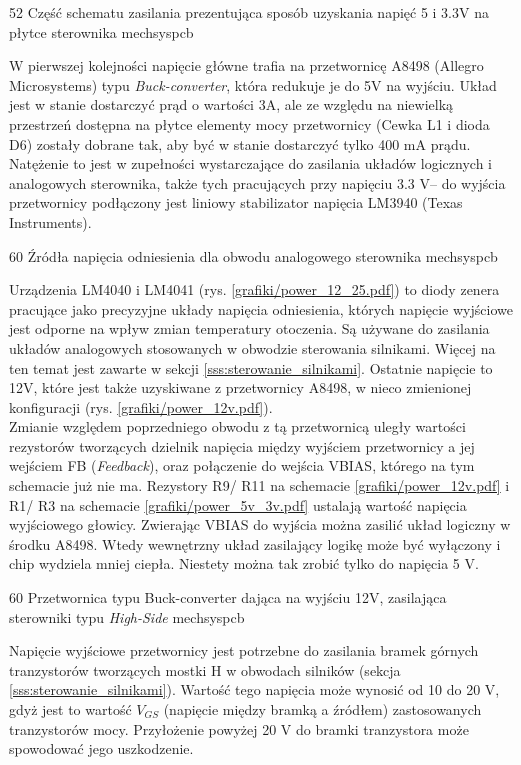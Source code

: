 	{52}
	{Część schematu zasilania prezentująca sposób uzyskania napięć 5 i 3.3V na płytce sterownika}
	{mechsyspcb}

W pierwszej kolejności napięcie główne trafia na przetwornicę A8498 (Allegro Microsystems) typu {\it Buck-converter}, która redukuje je do 5V na wyjściu. Układ jest w stanie dostarczyć prąd o wartości 3A, ale ze względu na niewielką przestrzeń dostępna na płytce elementy mocy przetwornicy (Cewka L1 i dioda D6) zostały dobrane tak, aby być w stanie dostarczyć tylko 400 mA prądu. Natężenie to jest w zupełności wystarczające do zasilania układów logicznych i analogowych sterownika, także tych pracujących przy napięciu 3.3 V-- do wyjścia przetwornicy podłączony jest liniowy stabilizator napięcia LM3940 (Texas Instruments).

	{60}
	{Źródła napięcia odniesienia dla obwodu analogowego sterownika}
	{mechsyspcb}
	
Urządzenia LM4040 i LM4041 (rys. \ref{grafiki/power_12_25.pdf}) to diody zenera pracujące jako precyzyjne układy napięcia odniesienia, których napięcie wyjściowe jest odporne na wpływ zmian temperatury otoczenia. Są używane do zasilania układów analogowych stosowanych w obwodzie sterowania silnikami. Więcej na ten temat jest zawarte w sekcji \ref{sss:sterowanie_silnikami}. Ostatnie napięcie to 12V, które jest także uzyskiwane z przetwornicy A8498, w nieco zmienionej konfiguracji (rys. \ref{grafiki/power_12v.pdf}). \\

Zmianie względem poprzedniego obwodu z tą przetwornicą uległy wartości rezystorów tworzących dzielnik napięcia między wyjściem przetwornicy a jej wejściem FB ({\it Feedback}), oraz połączenie do wejścia VBIAS, którego na tym schemacie już nie ma. Rezystory R9/ R11 na schemacie \ref{grafiki/power_12v.pdf} i R1/ R3 na schemacie \ref{grafiki/power_5v_3v.pdf} ustalają wartość napięcia wyjściowego głowicy. Zwierając VBIAS do wyjścia można zasilić układ logiczny w środku A8498. Wtedy wewnętrzny układ zasilający logikę może być wyłączony i chip wydziela mniej ciepła. Niestety można tak zrobić tylko do napięcia 5 V. 

	{60}
	{Przetwornica typu Buck-converter dająca na wyjściu 12V, zasilająca sterowniki typu {\it High-Side}}
	{mechsyspcb}

Napięcie wyjściowe przetwornicy jest potrzebne do zasilania bramek górnych tranzystorów tworzących mostki H w obwodach silników (sekcja \ref{sss:sterowanie_silnikami}). Wartość tego napięcia może wynosić od 10 do 20 V, gdyż jest to wartość $ V_{GS} $ (napięcie między bramką a źródłem) zastosowanych tranzystorów mocy. Przyłożenie powyżej 20 V do bramki tranzystora może spowodować jego uszkodzenie.  \\

